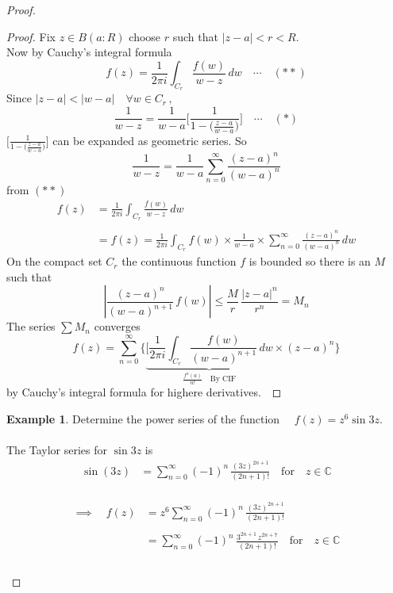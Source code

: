 \documentclass[11pt,a4paper]{article}
\theoremstyle{definition}
\newtheorem{example}[thm]{Example}
\begin{document}
\begin{proof}
\begin{proof}
Fix $z \in B(a: R)$ choose $r$ such that $\left|z - a\right| < r < R$.\\
Now by Cauchy's integral formula
$$f(z) = \frac{1}{2\pi i}\int_{C_r}\frac{f(w)}{w - z}\,dw\quad \cdots\quad  (**)$$
Since $\left|z - a\right| < \left|w - a\right|\quad  \forall w \in C_r\,,$
$$\frac{1}{w - z} = \frac{1}{w - a}\Bigg[\frac{1}{1 - \Big(\frac{z - a}{w - a}\Big)}\Bigg]\quad \cdots\quad  (*)$$
$\displaystyle{\Bigg[\frac{1}{1 - \Big(\frac{z - a}{w - a}\Big)}\Bigg]}$ can be expanded as geometric series. So $$\frac{1}{w - z} = \frac{1}{w - a}\sum^{\infty}_{n = 0}\frac{(z - a)^n}{(w - a)^n}$$ from $(**)$
\begin{align*}
f(z) & = \frac{1}{2\pi i}\int_{C_r}\frac{f(w)}{w - z}\,dw\\\\
& = f(z) = \frac{1}{2\pi i}\int_{C_r}f(w) \times \frac{1}{w - a}\times\sum^{\infty}_{n = 0}\frac{(z - a)^n}{(w - a)^n}\,dw
\end{align*}
On the compact set $C_r$ the continuous function $f$ is bounded so there is an $M$ such that 
$$\left|\frac{(z - a)^n}{(w - a)^{n + 1}}\,f(w)\right|\leq \frac{M}{r}\,\frac{\left|z - a\right|^n}{r^n} = M_n$$
The series $\displaystyle{\sum M_n}$ converges 
$$f(z) = \sum^{\infty}_{n = 0}\Bigg\{\underbrace{\Bigg[\frac{1}{2\pi i}\int_{C_r}\frac{f(w)}{(w - a)^{n+1}}\,dw}_{\frac{f^n(a)}{n!}\quad \text{By CIF}}\times (z - a)^n\Bigg\}$$
by Cauchy's integral formula for highere derivatives.\
\end{proof}

\begin{example}
Determine the power series of the function $\quad f(z) = z^6\sin 3z$.\\\\

The Taylor series for $\sin 3z$ is 
\begin{align*}
\sin (3z) & = \sum^{\infty}_{n = 0} (-1)^n\,\frac{(3z)^{2n+1}}{(2n + 1)!}\quad \text{for}\quad  z \in \mathbb{C}\\
\end{align*}



\begin{align*}
\implies\quad  f(z) & = z^6\sum^{\infty}_{n = 0} (-1)^n\,\frac{(3z)^{2n + 1}}{(2n + 1)!}\\\\
& = \sum^{\infty}_{n = 0}(-1)^n\,\frac{3^{2n + 1}\,z^{2n + 7}}{(2n + 1)!}\quad \text{for}\quad  z \in \mathbb{C}\\\\
\end{align*}
\end{example}
\end{proof}
\end{document}
